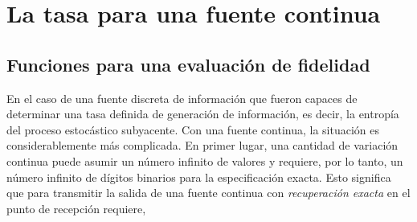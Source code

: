 \clearpage

\chapter{La tasa para una fuente continua}

\section{Funciones para una evaluaci\'on de fidelidad}

En el caso de una fuente discreta de informaci\'on que fueron capaces
de determinar una tasa definida de generaci\'on de informaci\'on, es
decir, la entrop\'ia del proceso estoc\'astico subyacente. Con una
fuente continua, la situaci\'on es considerablemente m\'as
complicada. En primer lugar, una cantidad de variaci\'on continua
puede asumir un n\'umero infinito de valores y requiere, por lo
tanto, un n\'umero infinito de d\'igitos binarios para la
especificaci\'on exacta. Esto significa que para transmitir la salida
de una fuente continua con {\em recuperaci\'on exacta} en el punto
de recepci\'on requiere,
